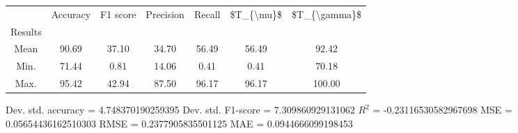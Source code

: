 \begin{tabular}{|c|c|c|c|c|c|c|}
\toprule
{} &  Accuracy &  F1 score &  Precision &  Recall &  \$T\_\{\textbackslash mu\}\$ &  \$T\_\{\textbackslash gamma\}\$ \\
Results &           &           &            &         &            &               \\
\hline
Mean    &     90.69 &     37.10 &      34.70 &   56.49 &      56.49 &         92.42 \\
Min.    &     71.44 &      0.81 &      14.06 &    0.41 &       0.41 &         70.18 \\
Max.    &     95.42 &     42.94 &      87.50 &   96.17 &      96.17 &        100.00 \\
\bottomrule
\end{tabular}

 Dev. std. accuracy = 4.748370190259395
 Dev. std. F1-score = 7.309860929131062
 $R^2$ = -0.23116530582967698
 MSE = 0.05654436162510303
 RMSE = 0.2377905835501125
 MAE = 0.0944666099198453